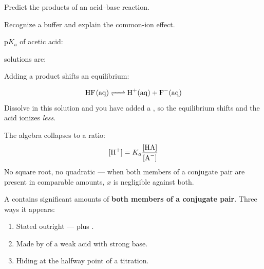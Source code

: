 \documentclass{apchem-notes}
\begin{document}

\begin{objectives}
  \item Predict the products of an acid--base reaction.
  \item Recognize a buffer and explain the common-ion effect.
\end{objectives}


\begin{warmup}[3]
  \item p$K_a$ of acetic acid: 
  \item {} solutions are: 
  \item Adding a product shifts an equilibrium:
\end{warmup}



\[ \ce{HF(aq) <=> H+(aq) + F^-(aq)} \]
Dissolve  in this solution and you have added a
, so the equilibrium shifts
 and the acid ionizes \emph{less}.

The algebra collapses to a ratio:
\[ [\ce{H+}] = K_a\frac{[\ce{HA}]}{[\ce{A^-}]} \]
No square root, no quadratic --- when both members of a conjugate pair are
present in comparable amounts, $x$ is negligible against both.



A  contains significant amounts of \textbf{both members of a
conjugate pair}. Three ways it appears:

\begin{enumerate}[leftmargin=*,itemsep=0.25em]
  \item Stated outright ---  plus .
  \item Made by  of a weak acid
        with strong base.
  \item Hiding at the halfway point of a titration.
\end{enumerate}
\end{document}
